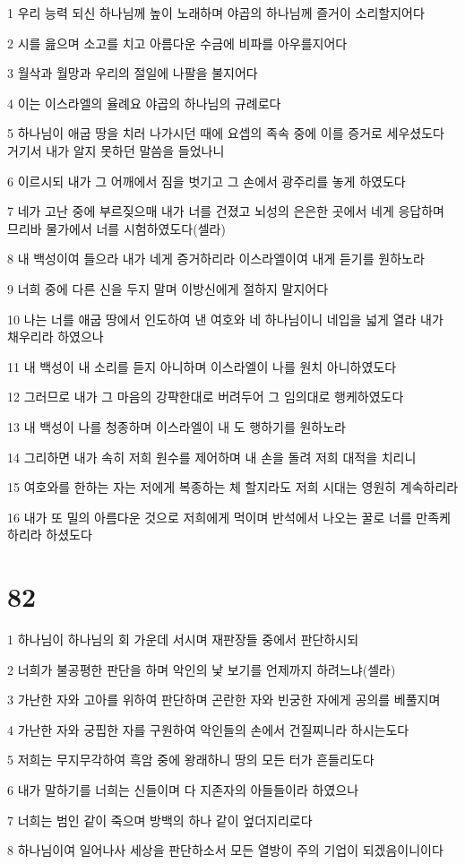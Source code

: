 \par 1 우리 능력 되신 하나님께 높이 노래하며 야곱의 하나님께 즐거이 소리할지어다
\par 2 시를 읊으며 소고를 치고 아름다운 수금에 비파를 아우를지어다
\par 3 월삭과 월망과 우리의 절일에 나팔을 불지어다
\par 4 이는 이스라엘의 율례요 야곱의 하나님의 규례로다
\par 5 하나님이 애굽 땅을 치러 나가시던 때에 요셉의 족속 중에 이를 증거로 세우셨도다 거기서 내가 알지 못하던 말씀을 들었나니
\par 6 이르시되 내가 그 어깨에서 짐을 벗기고 그 손에서 광주리를 놓게 하였도다
\par 7 네가 고난 중에 부르짖으매 내가 너를 건졌고 뇌성의 은은한 곳에서 네게 응답하며 므리바 물가에서 너를 시험하였도다(셀라)
\par 8 내 백성이여 들으라 내가 네게 증거하리라 이스라엘이여 내게 듣기를 원하노라
\par 9 너희 중에 다른 신을 두지 말며 이방신에게 절하지 말지어다
\par 10 나는 너를 애굽 땅에서 인도하여 낸 여호와 네 하나님이니 네입을 넓게 열라 내가 채우리라 하였으나
\par 11 내 백성이 내 소리를 듣지 아니하며 이스라엘이 나를 원치 아니하였도다
\par 12 그러므로 내가 그 마음의 강퍅한대로 버려두어 그 임의대로 행케하였도다
\par 13 내 백성이 나를 청종하며 이스라엘이 내 도 행하기를 원하노라
\par 14 그리하면 내가 속히 저희 원수를 제어하며 내 손을 돌려 저희 대적을 치리니
\par 15 여호와를 한하는 자는 저에게 복종하는 체 할지라도 저희 시대는 영원히 계속하리라
\par 16 내가 또 밀의 아름다운 것으로 저희에게 먹이며 반석에서 나오는 꿀로 너를 만족케 하리라 하셨도다

\chapter{82}

\par 1 하나님이 하나님의 회 가운데 서시며 재판장들 중에서 판단하시되
\par 2 너희가 불공평한 판단을 하며 악인의 낯 보기를 언제까지 하려느냐(셀라)
\par 3 가난한 자와 고아를 위하여 판단하며 곤란한 자와 빈궁한 자에게 공의를 베풀지며
\par 4 가난한 자와 궁핍한 자를 구원하여 악인들의 손에서 건질찌니라 하시는도다
\par 5 저희는 무지무각하여 흑암 중에 왕래하니 땅의 모든 터가 흔들리도다
\par 6 내가 말하기를 너희는 신들이며 다 지존자의 아들들이라 하였으나
\par 7 너희는 범인 같이 죽으며 방백의 하나 같이 엎더지리로다
\par 8 하나님이여 일어나사 세상을 판단하소서 모든 열방이 주의 기업이 되겠음이니이다

